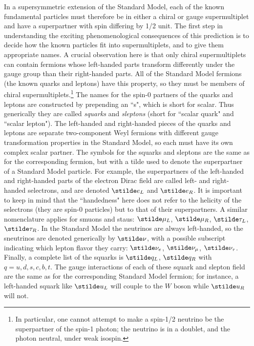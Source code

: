 In a supersymmetric extension of the Standard
Model,\cite{FayetHsnu,FayetMSSM,Rparity}
each of the
known fundamental particles must therefore be in either
a chiral or gauge
supermultiplet and have a superpartner with spin
differing by 1/2 unit.
The first step in understanding the exciting
phenomenological consequences of this prediction is to decide how the
known particles fit into supermultiplets, and to give them appropriate
names. A crucial observation here is that only chiral
supermultiplets can contain fermions whose left-handed parts transform
differently under the gauge group than their right-handed parts.
All of the Standard Model fermions
(the known quarks and leptons) have this property, so they must be
members of chiral supermultiplets.\footnote{In particular, one cannot
attempt to make a spin-1/2 neutrino be the superpartner of the spin-1
photon; the neutrino is in a doublet, and the photon
neutral, under weak isospin.}
The names for the spin-0 partners of the quarks and leptons are
constructed by prepending an ``s", which is short
for scalar. Thus generically they are called
{\it squarks} and {\it sleptons}
(short for ``scalar quark" and ``scalar lepton").
The left-handed and right-handed pieces of the quarks and leptons
are separate two-component Weyl fermions with different gauge
transformation properties in the
Standard Model, so each must have its own complex scalar partner.
The symbols for the
squarks and sleptons are the same as for the corresponding fermion,
but with a tilde used to denote the superpartner of a Standard Model
particle. For example, the superpartners of the left-handed and
right-handed parts of the electron Dirac field
are called left- and right-handed selectrons,
and are denoted $\stilde e_L$ and $\stilde e_R$.
It is important to keep in mind that the ``handedness" here
does not refer to the helicity of the selectrons (they are
spin-0 particles) but to that of their superpartners.
A similar nomenclature
applies for smuons and staus: $\stilde \mu_L$, $\stilde\mu_R$,
$\stilde\tau_L$, $\stilde \tau_R$. In the Standard Model
the neutrinos are always left-handed, so the sneutrinos are denoted
generically by $\stilde\nu$, with a possible subscript indicating which
lepton flavor they carry: $\stilde\nu_e$, $\stilde\nu_\mu$,
$\stilde\nu_\tau$.
Finally, a complete list of the squarks is
$\stilde q_L$, $\stilde q_R$ with $q=u,d,s,c,b,t$.
The gauge interactions of each of these squark and slepton field
are the same as for the corresponding Standard Model fermion;
for instance, a left-handed squark like $\stilde u_L$ will couple to    
the $W$ boson while $\stilde u_R$ will not.

